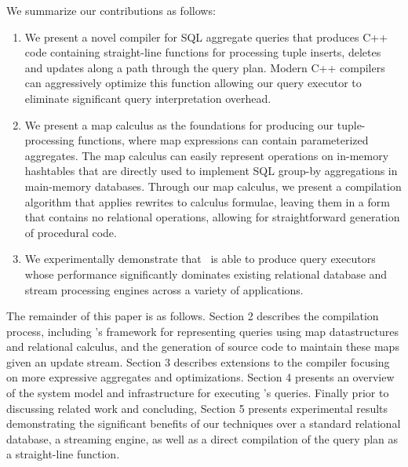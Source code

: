 We summarize our contributions as follows:

\begin{enumerate}
  \item We present a novel compiler for SQL aggregate queries that produces C++
code containing straight-line functions for processing tuple inserts, deletes
and updates along a path through the query plan. Modern C++ compilers can
aggressively optimize this function allowing our query executor to eliminate
significant query interpretation overhead.
  \item We present a map calculus as the foundations for producing our
tuple-processing functions, where map expressions can contain parameterized
aggregates. The map calculus can easily represent operations on in-memory
hashtables that are directly used to implement SQL group-by aggregations in
main-memory data\-ba\-ses. Through our map calculus, we present a compilation
algorithm that applies rewrites to calculus formulae, leaving them in a
form that contains no relational operations, allowing for straightforward
generation of procedural code.
  \item We experimentally demonstrate that \compiler\ is able to produce query
executors whose performance significantly dominates existing relational database
and stream processing engines across a variety of applications.
\end{enumerate}

The remainder of this paper is as follows. Section 2 describes the compilation
process, including \compiler's framework for representing queries using map
datastructures and relational calculus, and the generation of source code to
maintain these maps given an update stream. Section 3 describes extensions to the
compiler focusing on more expressive aggregates and optimizations. Section 4
presents an overview of the system model and infrastructure for executing
\compiler's queries. Finally prior to discussing related work and concluding,
Section 5 presents experimental results demonstrating the significant benefits
of our techniques over a standard relational database, a streaming engine, as
well as a direct compilation of the query plan as a straight-line function.

